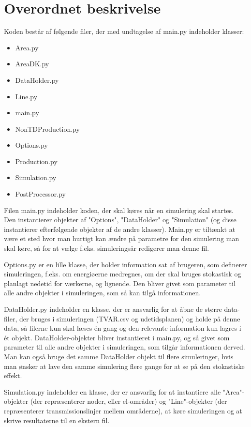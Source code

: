 \documentclass{article}
\begin{document}
\section{Overordnet beskrivelse}
Koden består af følgende filer, der med undtagelse af main.py indeholder klasser:
\begin{itemize}
    \item Area.py
    \item AreaDK.py
    \item DataHolder.py
    \item Line.py
    \item main.py
    \item NonTDProduction.py
    \item Options.py
    \item Production.py
    \item Simulation.py
    \item PostProcessor.py
\end{itemize}
Filen main.py indeholder koden, der skal køres når en simulering skal startes. Den instantierer objekter af "Options", "DataHolder" og "Simulation" (og disse instantierer efterfølgende objekter af de andre klasser). Main.py er tiltænkt at være et sted hvor man hurtigt kan ændre på parametre for den simulering man skal køre, så for at vælge f.eks. simuleringsår redigerer man denne fil. 

Options.py er en lille klasse, der holder information sat af brugeren, som definerer simuleringen, f.eks. om energiøerne medregnes, om der skal bruges stokastisk og planlagt nedetid for værkerne, og lignende. Den bliver givet som parameter til alle andre objekter i simuleringen, som så kan tilgå informationen. 

DataHolder.py indeholder en klasse, der er ansvarlig for at åbne de større data-filer, der bruges i simuleringen (TVAR.csv og udetidsplanen) og holde på denne data, så filerne kun skal læses én gang og den relevante information kun lagres i ét objekt. DataHolder-objekter bliver instantieret i main.py, og så givet som parameter til alle andre objekter i simuleringen, som tilgår informationen derved. Man kan også bruge det samme DataHolder objekt til flere simuleringer, hvis man ønsker at lave den samme simulering flere gange for at se på den stokastiske effekt. 

Simulation.py indeholder en klasse, der er ansvarlig for at instantiere alle "Area"-objekter (der repræsenterer noder, eller el-områder) og "Line"-objekter (der repræsenterer transmissionslinjer mellem områderne), at køre simuleringen og at skrive resultaterne til en ekstern fil. 
\end{document}
